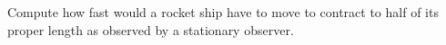 Compute how fast would a rocket ship have to move to contract 
to half of its proper length as observed by a stationary observer. %